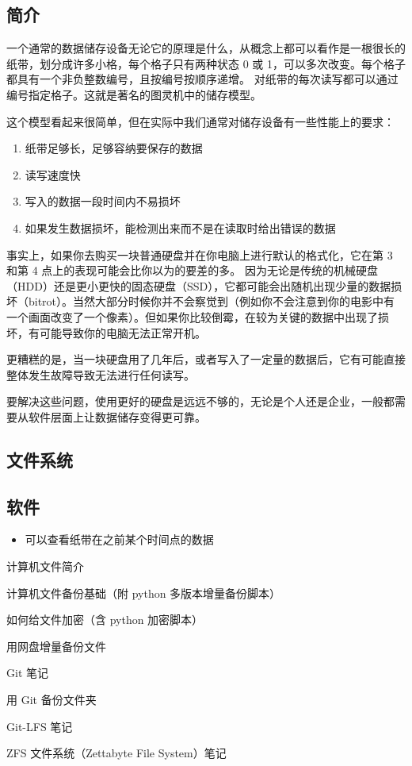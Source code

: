 
\begin{issues}
\issueDraft
\end{issues}

\subsection{简介}
一个通常的数据储存设备无论它的原理是什么，从概念上都可以看作是一根很长的纸带，划分成许多小格，每个格子只有两种状态 0 或 1，可以多次改变。每个格子都具有一个非负整数编号，且按编号按顺序递增。 对纸带的每次读写都可以通过编号指定格子。这就是著名的图灵机中的储存模型。

这个模型看起来很简单，但在实际中我们通常对储存设备有一些性能上的要求：
\begin{enumerate}
\item 纸带足够长，足够容纳要保存的数据
\item 读写速度快
\item 写入的数据一段时间内不易损坏
\item 如果发生数据损坏，能检测出来而不是在读取时给出错误的数据
\end{enumerate}

事实上，如果你去购买一块普通硬盘并在你电脑上进行默认的格式化，它在第 3 和第 4 点上的表现可能会比你以为的要差的多。 因为无论是传统的机械硬盘（HDD）还是更小更快的固态硬盘（SSD），它都可能会出随机出现少量的数据损坏（bitrot）。当然大部分时候你并不会察觉到（例如你不会注意到你的电影中有一个画面改变了一个像素）。但如果你比较倒霉，在较为关键的数据中出现了损坏，有可能导致你的电脑无法正常开机。

更糟糕的是，当一块硬盘用了几年后，或者写入了一定量的数据后，它有可能直接整体发生故障导致无法进行任何读写。

要解决这些问题，使用更好的硬盘是远远不够的，无论是个人还是企业，一般都需要从软件层面上让数据储存变得更可靠。

\subsection{文件系统}

\subsection{软件}
\begin{itemize}
\item 可以查看纸带在之前某个时间点的数据
\end{itemize}


计算机文件简介

计算机文件备份基础（附 python 多版本增量备份脚本）

如何给文件加密（含 python 加密脚本）

用网盘增量备份文件

Git 笔记

用 Git 备份文件夹

Git-LFS 笔记

ZFS 文件系统（Zettabyte File System）笔记
